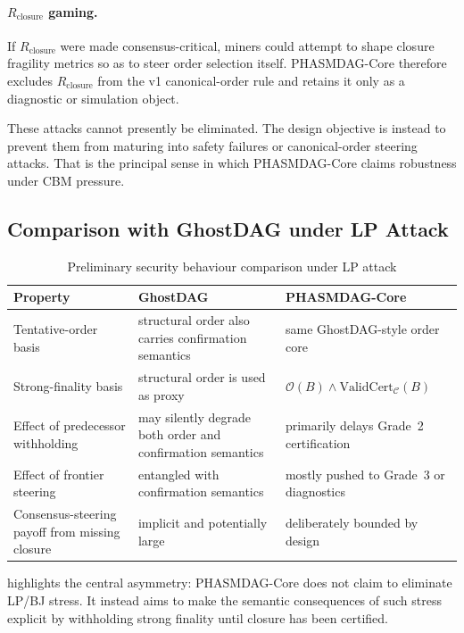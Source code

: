 \documentclass[11pt]{article}
\theoremstyle{definition}
\theoremstyle{plain}
\theoremstyle{remark}
\newcommand{\Ostr}{\mathcal{O}}          %
\newcommand{\Rcls}{R_{\mathrm{closure}}} %
\begin{document}
\paragraph{$\Rcls$ gaming.}
If $\Rcls$ were made consensus-critical, miners could attempt to shape closure
fragility metrics so as to steer order selection itself.
PHASMDAG-Core therefore excludes $\Rcls$ from the v1 canonical-order rule and
retains it only as a diagnostic or simulation object.

These attacks cannot presently be eliminated.
The design objective is instead to prevent them from maturing into safety
failures or canonical-order steering attacks.
That is the principal sense in which PHASMDAG-Core claims robustness under
CBM pressure.

\subsection{Comparison with GhostDAG under LP Attack}

\begin{table}[t]
\centering
\caption{Preliminary security behaviour comparison under LP attack}
\label{tab:comparison}
\small
\renewcommand{\arraystretch}{1.1}
\begin{tabularx}{0.96\textwidth}{@{}L{3.2cm}YY@{}}
\toprule
\textbf{Property} & \textbf{GhostDAG} & \textbf{PHASMDAG-Core} \\
\midrule
Tentative-order basis
    & structural order also carries confirmation semantics
    & same GhostDAG-style order core \\
Strong-finality basis
    & structural order is used as proxy
    & $\Ostr(B) \wedge \mathrm{ValidCert}_{\mathcal{C}}(B)$ \\
Effect of predecessor withholding
    & may silently degrade both order and confirmation semantics
    & primarily delays Grade~2 certification \\
Effect of frontier steering
    & entangled with confirmation semantics
    & mostly pushed to Grade~3 or diagnostics \\
Consensus-steering payoff from missing closure
    & implicit and potentially large
    & deliberately bounded by design \\
\bottomrule
\end{tabularx}
\end{table}

 highlights the central asymmetry:
PHASMDAG-Core does not claim to eliminate LP/BJ stress.
It instead aims to make the semantic consequences of such stress explicit by
withholding strong finality until closure has been certified.
\end{document}
